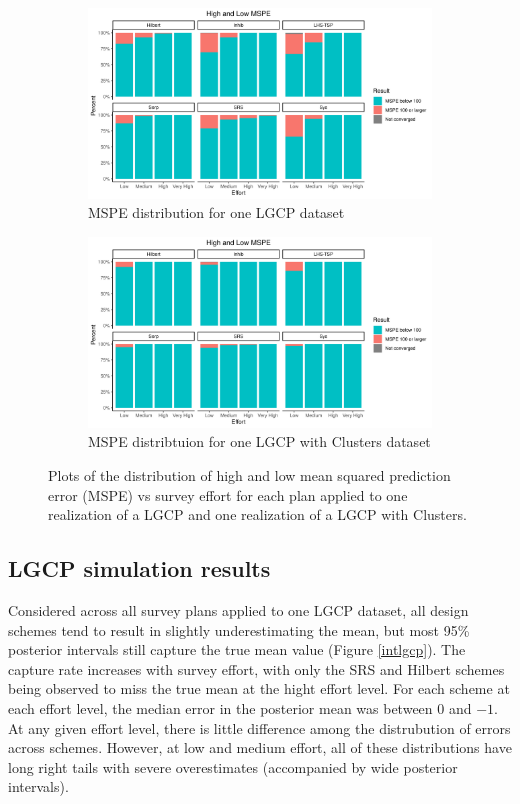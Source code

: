 \documentclass[review]{elsarticle}
\begin{document}
\begin{figure}

\begin{subfigure}{4.5in}
\includegraphics[width=4.5in]{../graphics/HighMSPE-LGCP000004.png}
\caption{MSPE distribution for one LGCP dataset}
\label{highmspelgcp}
\end{subfigure}

\begin{subfigure}{4.5in}
\includegraphics[width=4.5in]{../graphics/HighMSPE-Cluster000004.png}
\caption{MSPE distribtuion for one LGCP with Clusters dataset}
\label{highmspecluster}
\end{subfigure}

\caption{Plots of the distribution of high and low mean squared prediction
error (MSPE) vs survey effort for each plan applied to one realization of a
LGCP and one realization of a LGCP with Clusters.}
\label{histmsperesults}
\end{figure}


\subsection{LGCP simulation results}

Considered across all survey plans applied to one LGCP dataset, all design
schemes tend to result in slightly underestimating the mean, but most
95\% posterior intervals still capture the true mean value (Figure
\ref{intlgcp}). The capture rate increases with survey effort, with only
the SRS and Hilbert schemes being observed to miss the true mean at the
hight effort level. For each scheme at each effort level, the median
error in the posterior mean was between 0 and \(-1\). At any given effort
level, there is little difference among the distrubution of errors across
schemes. However, at low and medium effort, all of these distributions
have long right tails with severe overestimates (accompanied by wide
posterior intervals).
\end{document}
